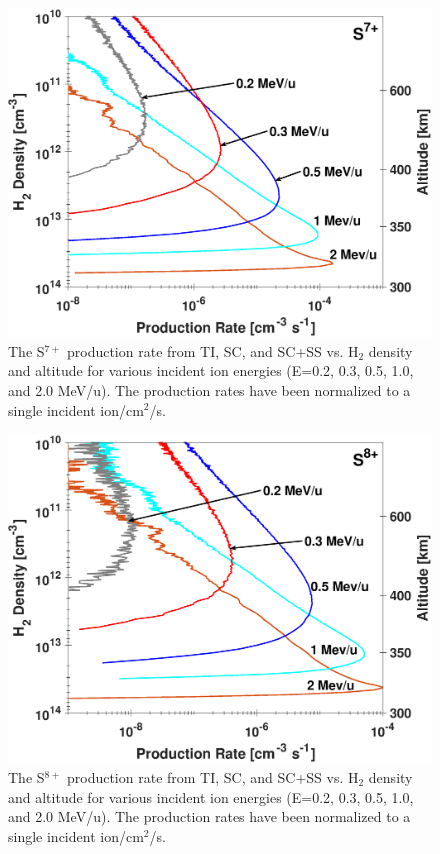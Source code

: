 \documentclass[draft]{agujournal2018}
\begin{document}
\begin{figure}[ht]
    \centering
    \includegraphics[width=\textwidth]{Figures/S7CXProd.eps}
    \caption{The S$^{7+}$ production rate from TI, SC, and SC+SS vs. H$_2$ density and altitude for various incident ion energies (E=0.2, 0.3, 0.5, 1.0, and 2.0 MeV/u). The production rates have been normalized to a single incident ion/cm$^2$/s.}
    \label{fig:S7+Prod}
\end{figure}

\begin{figure}[ht]
    \centering
    \includegraphics[width=\textwidth]{Figures/S8CXProd.eps}
    \caption{The S$^{8+}$ production rate from TI, SC, and SC+SS vs. H$_2$ density and altitude for various incident ion energies (E=0.2, 0.3, 0.5, 1.0, and 2.0 MeV/u). The production rates have been normalized to a single incident ion/cm$^2$/s.}
    \label{fig:S8+Prod}
\end{figure}
\end{document}
